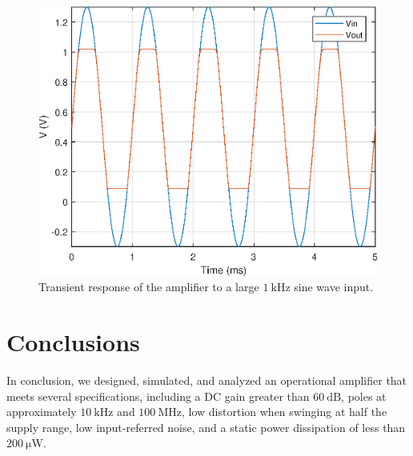\documentclass[journal,hidelinks]{IEEEtran}
\begin{document}
\begin{figure}[!htb]
  \centering
  \includegraphics[width=\columnwidth]{figures/tran_8m.eps}
  \caption{Transient response of the amplifier to a large $\SI{1}{\kilo\hertz}$ sine wave input.}
  \label{fig:tran_8m}
\end{figure}

\section{Conclusions}

In conclusion, we designed, simulated, and analyzed an operational amplifier that meets several specifications, including a DC gain greater than $\SI{60}{\deci\bel}$, poles at approximately $\SI{10}{\kilo\hertz}$ and $\SI{100}{\mega\hertz}$, low distortion when swinging at half the supply range, low input-referred noise, and a static power dissipation of less than $\SI{200}{\micro\watt}$.



\end{document}
